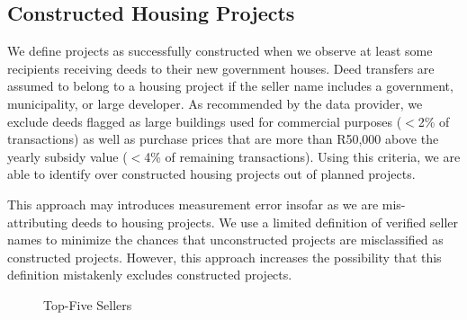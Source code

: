 \documentclass[12pt]{article}
\begin{document}

\subsection{Constructed Housing Projects}



We define projects as successfully constructed when we observe at least some recipients receiving deeds to their new government houses.  Deed transfers are assumed to belong to a housing project if the seller name includes a government, municipality, or large developer.  As recommended by the data provider, we exclude deeds flagged as large buildings used for commercial purposes ($<$2\% of transactions) as well as purchase prices that are more than R50,000 above the yearly subsidy value ($<$4\% of remaining transactions).  Using this criteria, we are able to identify over  constructed housing projects out of planned projects.

This approach may introduces measurement error insofar as we are mis-attributing deeds to housing projects.  We use a limited definition of verified seller names to minimize the chances that unconstructed projects are misclassified as constructed projects.  However, this approach increases the possibility that this definition mistakenly excludes constructed projects.

\begin{figure}
\caption{Top-Five Sellers}\label{figure:topfivesellers}
\centering

\end{figure}
\end{document}
